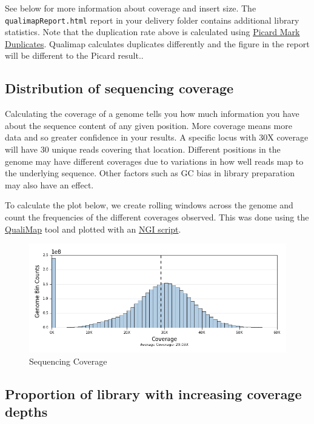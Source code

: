 \documentclass[]{article}
\begin{document}
See below for more information about coverage and insert size. The
\texttt{qualimapReport.html} report in your delivery folder contains
additional library statistics. Note that the duplication rate above is
calculated using
\href{http://broadinstitute.github.io/picard/command-line-overview.html\#MarkDuplicates}{Picard
Mark Duplicates}. Qualimap calculates duplicates differently and the
figure in the report will be different to the Picard result..

\subsection{Distribution of sequencing
coverage}\label{distribution-of-sequencing-coverage}

Calculating the coverage of a genome tells you how much information you
have about the sequence content of any given position. More coverage
means more data and so greater confidence in your results. A specific
locus with 30X coverage will have 30 unique reads covering that
location. Different positions in the genome may have different coverages
due to variations in how well reads map to the underlying sequence.
Other factors such as GC bias in library preparation may also have an
effect.

To calculate the plot below, we create rolling windows across the genome
and count the frequencies of the different coverages observed. This was
done using the \href{http://qualimap.bioinfo.cipf.es/}{QualiMap} tool
and plotted with an
\href{https://github.com/SciLifeLab/visualizations}{NGI script}.

\begin{figure}[htbp]
\centering
\includegraphics{plots/qualimap_coverage.png}
\caption{Sequencing Coverage}
\end{figure}

\subsection{Proportion of library with increasing coverage
depths}\label{proportion-of-library-with-increasing-coverage-depths}
\end{document}
